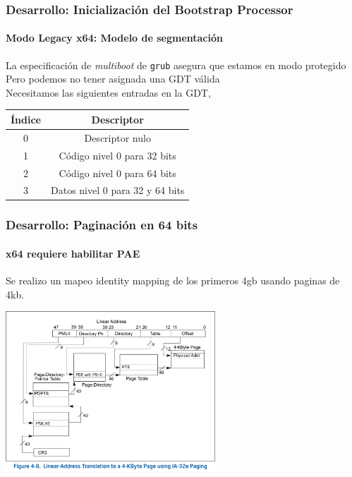 \documentclass{beamer}
\begin{document}
\begin{frame}
  \frametitle{Desarrollo: Inicialización del Bootstrap Processor} %
  \framesubtitle{Modo Legacy x64: Modelo de segmentación}
  \small
  La especificación de \emph{multiboot} de \texttt{grub} asegura que estamos en modo protegido\\
  \vspace{0.5cm}
  Pero podemos no tener asignada una GDT válida\\
  \vspace{0.5cm}
  Necesitamos las siguientes entradas en la GDT,
  \vspace{0.5cm}
  \begin{center}
  \begin{tabular}{|c|c|}
  \hline
  Índice & Descriptor\\
  \hline
  0 & Descriptor nulo\\
  \hline
  1 & Código nivel 0 para 32 bits\\
  \hline
  2 & Código nivel 0 para 64 bits\\
  \hline
  3 & Datos nivel 0 para 32 y 64 bits\\
  \hline
  \end{tabular}
  \end{center}
\end{frame}

\begin{frame}
  \frametitle{Desarrollo: Paginación en 64 bits}
  \framesubtitle{x64 requiere habilitar PAE}
  Se realizo un mapeo identity mapping de los primeros 4gb usando paginas de 4kb.
  \begin{center}
  \includegraphics[height=6cm]{images/ia32-paging-overview_INTEL.png} 
  \end{center}
\end{frame}
\end{document}
